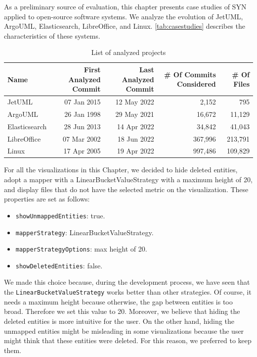 As a preliminary source of evaluation, this chapter presents case studies of SYN applied to open-source software systems. 
We analyze the evolution of JetUML, ArgoUML, Elasticsearch, LibreOffice, and Linux. 
\autoref{tab:casestudies} describes the characteristics of these systems.

\begin{table}[ht]
	\small
    \centering
    \begin{tabular}{lrrrr} 
        \hline
        {\bf Name} & {\bf First Analyzed Commit} & {\bf Last Analyzed Commit} & {\bf \# Of Commits Considered} & {\bf \# Of Files}\\ 
        \hline
        JetUML & 07 Jan 2015 & 12 May 2022 & 2,152 & 795\\ 
        ArgoUML & 26 Jan 1998 & 29 May 2021 & 16,672 & 11,129 \\
        Elasticsearch & 28 Jun 2013 & 14 Apr 2022 & 34,842 & 41,043 \\
        LibreOffice & 07 Mar 2002 & 18 Jun 2022 & 367,996 & 213,791 \\
        Linux & 17 Apr 2005 & 19 Apr 2022 & 997,486 & 109,829
    \end{tabular}
    \caption{List of analyzed projects}
    \label{tab:casestudies}
\end{table}



For all the visualizations in this Chapter, we decided to hide deleted entities, adopt a mapper with a LinearBucketValueStrategy with a maximum height of 20, and display files that do not have the selected metric on the visualization. 
These properties are set as follows:
\begin{itemize}
    \item \texttt{showUnmappedEntities}: true.
    \item \texttt{mapperStrategy}: LinearBucketValueStrategy.
    \item \texttt{mapperStrategyOptions}: max height of 20.
    \item \texttt{showDeletedEntities}: false.
\end{itemize}
We made this choice because, during the development process, we have seen that the \texttt{LinearBucketValueStrategy} works better than other strategies. Of course, it needs a maximum height because otherwise, the gap between entities is too broad. Therefore we set this value to 20. Moreover, we believe that hiding the deleted entities is more intuitive for the user. On the other hand, hiding the unmapped entities might be misleading in some visualizations because the user might think that these entities were deleted. For this reason, we preferred to keep them. 


